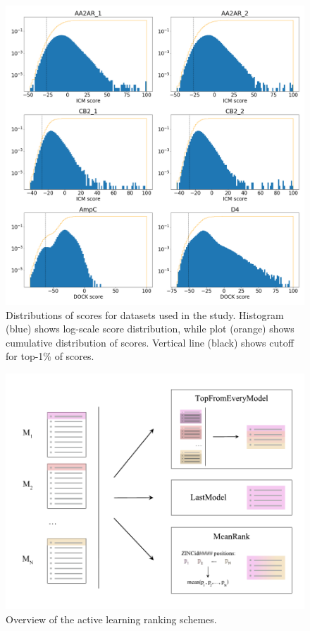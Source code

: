 \begin{figure}[ht]
\centering
\includegraphics[width=1.0\textwidth]{figures/figure_1_scores_distribution.png}
\caption{Distributions of scores for datasets used in the study. Histogram (blue) shows log-scale score distribution, while plot (orange) shows cumulative distribution of scores. Vertical line (black) shows cutoff for top-1\% of scores.}
\label{fig:fig_1_distribution}
\end{figure}


\begin{figure}[ht]
\centering
\includegraphics[width=1.0\textwidth]{figures/Figure_2_v4.pdf}
\caption{Overview of the active learning ranking schemes.}
\label{fig:fig_2_scheme}
\end{figure}


